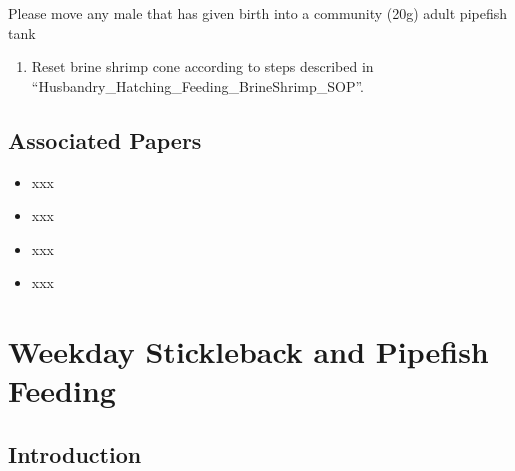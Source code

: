 \documentclass[
  letterpaper,
  DIV=11,
  numbers=noendperiod]{scrreprt}
\providecommand{\tightlist}{%
  \setlength{\itemsep}{0pt}\setlength{\parskip}{0pt}}\usepackage{longtable,booktabs,array}
\begin{document}
\begin{tcolorbox}[enhanced jigsaw, rightrule=.15mm, title=\textcolor{quarto-callout-warning-color}{\faExclamationTriangle}\hspace{0.5em}{NOTES}, titlerule=0mm, opacitybacktitle=0.6, toprule=.15mm, bottomrule=.15mm, opacityback=0, left=2mm, colframe=quarto-callout-warning-color-frame, breakable, coltitle=black, colback=white, colbacktitle=quarto-callout-warning-color!10!white, bottomtitle=1mm, leftrule=.75mm, toptitle=1mm, arc=.35mm]

Please move any male that has given birth into a community (20g) adult
pipefish tank

\end{tcolorbox}

\begin{enumerate}
\def\labelenumi{\arabic{enumi}.}
\setcounter{enumi}{4}
\tightlist
\item
  Reset brine shrimp cone according to steps described in
  ``Husbandry\_Hatching\_Feeding\_BrineShrimp\_SOP''.
\end{enumerate}

\hypertarget{associated-papers-32}{%
\section{Associated Papers}\label{associated-papers-32}}

\begin{itemize}
\tightlist
\item
  xxx
\item
  xxx
\item
  xxx
\item
  xxx
\end{itemize}

\hypertarget{sec-husbandry-weekday_feeding}{%
\chapter{Weekday Stickleback and Pipefish
Feeding}\label{sec-husbandry-weekday_feeding}}

\hypertarget{introduction-48}{%
\section{Introduction}\label{introduction-48}}
\end{document}
